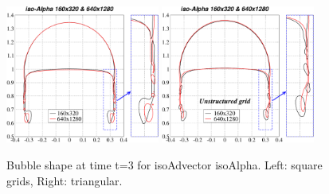 \documentclass[review]{elsarticle}
\begin{document}
\begin{figure}[!h]
\begin{center}
 \includegraphics[width=0.45\textwidth]{figures/bubble_shape_t=3_isoAlpha-struct.pdf}
 \hspace{2mm}
 \includegraphics[width=0.45\textwidth]{figures/bubble_shape_t=3_isoAlpha-uns.pdf}
 \vspace{-6mm}
\end{center}
\caption{Bubble shape at time t=3 for isoAdvector isoAlpha. Left: square grids, Right: triangular.}
\label{fig:HB_bubble_shape_3_isoAlpha}
\end{figure}
\end{document}
